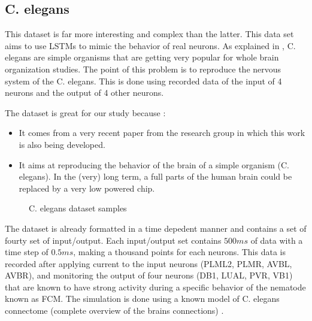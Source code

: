 \subsection{\acl{C. elegans}}\label{subsec:celegans}

This dataset is far more interesting and complex than the latter. This data set aims to use \acp{LSTM} to mimic the behavior of real neurons. As explained in \cite{celegans}, \acf{C. elegans} are simple organisms that are getting very popular for whole brain organization studies. The point of this problem is to reproduce the nervous system of the \ac{C. elegans}. This is done using recorded data of the input of 4 neurons and the output of 4 other neurons.

The dataset is great for our study because :
\begin{itemize}
  \item It comes from a very recent paper from the research group in which this work is also being developed.
  \item It aims at reproducing the behavior of the brain of a simple organism (\ac{C. elegans}). In the (very) long term, a full parts of the human brain could be replaced by a very low powered chip.
\end{itemize}

\begin{figure}[H]
  \centering
  \begin{minipage}{\columnwidth}
    \hfill
  \end{minipage}
  \begin{minipage}{\columnwidth}
    \hfill
  \end{minipage}
  \caption{\ac{C. elegans} dataset samples}
  \label{graph:celegans}
\end{figure}

The dataset is already formatted in a time depedent manner and contains a set of fourty set of input/output. Each input/output set contains $500ms$ of data with a time step of $0.5ms$, making a thousand points for each neurons. This data is recorded after applying current to the input neurons (PLML2, PLMR, AVBL, AVBR), and monitoring the output of four neurons (DB1, LUAL, PVR, VB1) that are known to have strong activity during  a specific behavior of the nematode known as \ac{FCM}. The simulation is done using a known model of \ac{C. elegans} connectome (complete overview of the brains connections) \cite{celegans}.

